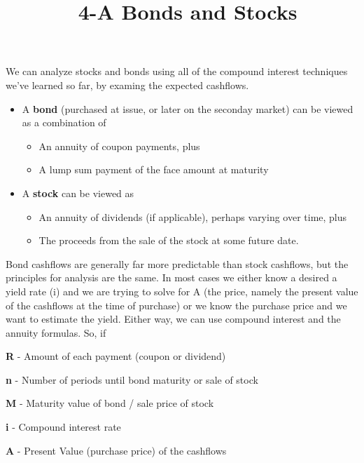 \documentclass[12pt]{article}
\title{\normalfont\ 4-A Bonds and Stocks} %
\author{} %
\date{}  %
\begin{document}
\maketitle %

\vspace{-1.1in}

\begin{flushleft}
    We can analyze {stocks} and {bonds} using all of the compound interest techniques we've
    learned so far, by examing the expected cashflows.
\end{flushleft}
\vspace{.05in}

\begin{itemize}
    \item A \textbf{bond} (purchased at issue, or later on the seconday market) can be viewed as a combination of
    \begin{itemize}
        \item An annuity of coupon payments, plus
        \item A lump sum payment of the face amount at maturity
    \end{itemize}
    \item A \textbf{stock} can be viewed as
    \begin{itemize}
        \item An annuity of dividends (if applicable), perhaps varying over time, plus
        \item The proceeds from the sale of the stock at some future date.
    \end{itemize}
\end{itemize}
\vspace{.1in}

\begin{flushleft}
    Bond cashflows are generally far more predictable than stock cashflows, but the principles
    for analysis are the same.  In most cases we either know a desired a yield rate (i) and we are trying
    to solve for A (the price, namely the present value of the cashflows at the time of purchase) or we
    know the purchase price and we want to estimate the yield.  Either way, we can use compound interest and
    the annuity formulas.  So, if
\end{flushleft}
\vspace{.1in}

\begin{description}
    \item \textbf{R} - Amount of each payment (coupon or dividend)
    \item\textbf{n} - Number of periods until bond maturity or sale of stock
    \item\textbf{M} - Maturity value of bond / sale price of stock
    \item\textbf{i} - Compound interest rate
    \item\textbf{A} - Present Value (purchase price) of the cashflows
\end{description}
\vspace{.1in}
\end{document}
